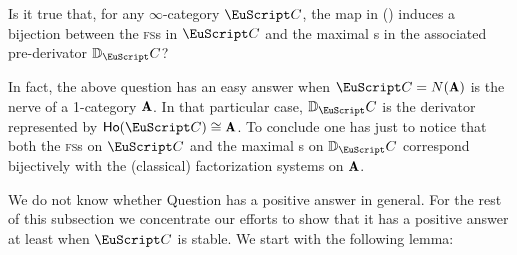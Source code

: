 \begin{question}\label{question_infty}
Is it true that, for any $\infty$-category $\iC$, the map in () induces a bijection between the \textsc{fs}s in $\iC$ and the maximal {\dfs}s in the associated pre-derivator $\D_\iC$?
\end{question}

In fact, the above question has an easy answer when $\iC=N(\A)$ is the nerve of a 1-category $\A$. In that particular case, $\D_\iC$ is the derivator represented by $\ho(\iC)\cong\A$. To conclude one has just to notice that both the \textsc{fs}s on $\iC$ and the maximal {\dfs}s on $\D_\iC$ correspond bijectively with the (classical) factorization systems on $\A$. 

We do not know whether Question  has a positive answer in general. For the rest of this subsection we concentrate our efforts to show that it has a positive answer at least when $\iC$ is stable. We start with the following lemma:

